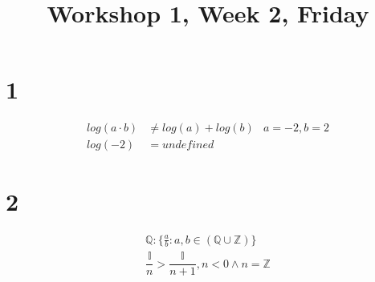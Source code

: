 \documentclass[danish,english,10pt,a4paper]{article}
\title{Workshop 1, Week 2, Friday}
\begin{document}
\maketitle

\section*{1}
\begin{align}
log(a \cdot b) &\not = log(a)+log(b) & a=-2, b=2\\
log(-2) &= undefined
\end{align}

\section*{2}
\begin{align}
\mathbb{Q}: \{ \frac{a}{b}:a, b \in (\mathbb{Q} \cup \mathbb{Z})\}\\
\dfrac{\mathbb{I}}{n} > \dfrac{\mathbb{I}}{n+1}, n < 0 \wedge n = \mathbb{Z}
\end{align}
\end{document}
